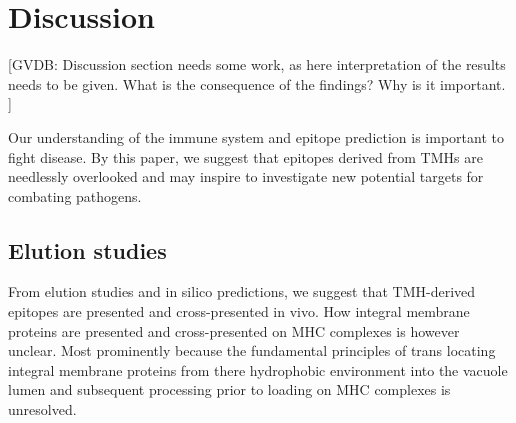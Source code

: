 \section{Discussion}

[GVDB: 
  Discussion section needs some work, 
  as here interpretation of the results needs to be given. 
  What is the consequence of the findings? Why is it important. 
]


Our understanding of the immune system and epitope prediction is 
important to fight disease. By this paper, we suggest that epitopes
derived from TMHs are needlessly overlooked and may inspire to investigate
new potential targets for combating pathogens.
\subsection{Elution studies}


From elution studies and in silico predictions, 
we suggest that TMH-derived epitopes are presented and cross-presented in vivo. How integral membrane proteins are presented and cross-presented on MHC complexes is however unclear. Most prominently because the fundamental principles of trans locating integral membrane proteins from there hydrophobic environment into the vacuole lumen and subsequent processing prior to loading on MHC complexes is unresolved. 


